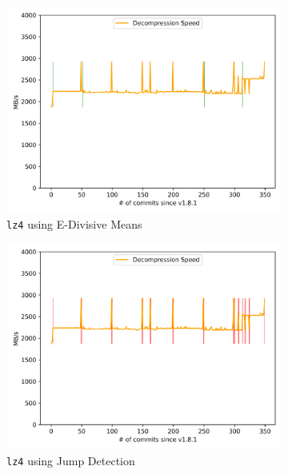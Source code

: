 \documentclass[	runningheads,
				a4paper]{llncs}
\begin{document}
\begin{figure}[ht!]
	\centering
	\begin{subfigure}[b]{0.3\textwidth}
		\includegraphics[width=\textwidth]{graph/lz4_commit_e-divisive}
		\caption{\texttt{lz4} using E-Divisive Means}
	\end{subfigure}
	\begin{subfigure}[b]{0.3\textwidth}
		\includegraphics[width=\textwidth]{graph/lz4_commit_jump}
		\caption{\texttt{lz4} using Jump Detection}
	\end{subfigure}
	\begin{subfigure}[b]{0.3\textwidth}

\end{subfigure}
\end{figure}
\end{document}
